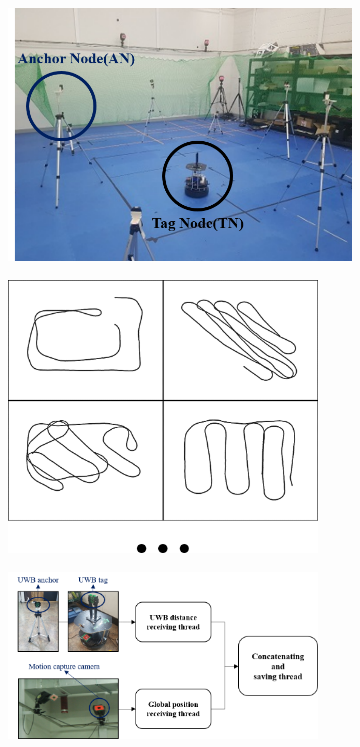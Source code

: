 \documentclass{ieeeaccess}
\begin{document}
\begin{figure}[h]
	\centering
	\begin{subfigure}[b]{.25\textwidth}
		\centering
		\includegraphics[width=.9\textwidth]{anchor_tag_nodes}
		\label{fig:dataset} 	
		\caption{}
	\end{subfigure}%
	\begin{subfigure}[b]{.25\textwidth}
		\centering
		\includegraphics[width=0.9\textwidth]{paths}
		\label{fig:nodes} 	
		\caption{}
	\end{subfigure}%
	\begin{subfigure}[b]{.5\textwidth}
		\centering
		\includegraphics[width=0.9\textwidth]{dataset_process}

\end{subfigure}
\end{figure}
\end{document}
